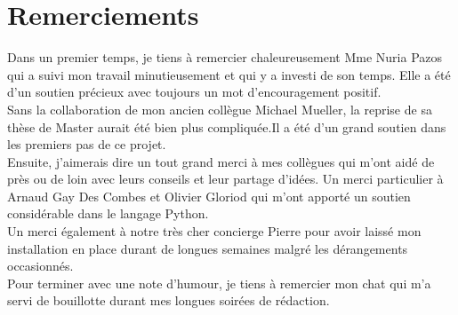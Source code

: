 \chapter{Remerciements}
Dans un premier temps, je tiens à remercier chaleureusement Mme Nuria Pazos qui a suivi mon travail minutieusement et qui y a investi de son temps. Elle a été d'un soutien précieux avec toujours un mot d'encouragement positif. 
\\[0.2in]

Sans la collaboration de mon ancien collègue Michael Mueller, la reprise de sa thèse de Master aurait été bien plus compliquée.Il a été d'un grand soutien dans les premiers pas de ce projet. 
\\[0.2in]

Ensuite, j'aimerais dire un tout grand merci à mes collègues qui m'ont aidé de près ou de loin avec leurs conseils et leur partage d'idées. Un merci particulier à Arnaud Gay Des Combes et Olivier Gloriod qui m'ont apporté un soutien considérable dans le langage Python. 
\\[0.2in]

Un merci également à notre très cher concierge Pierre pour avoir laissé mon installation en place durant de longues semaines malgré les dérangements occasionnés.
\\[0.2in]

Pour terminer avec une note d'humour, je tiens à remercier mon chat qui m'a servi de bouillotte durant mes longues soirées de rédaction. 


